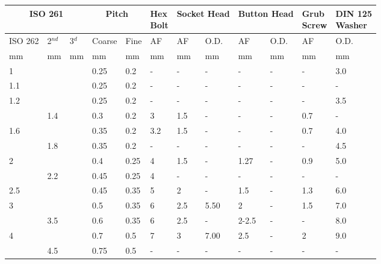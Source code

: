 \begin{table}[h!]
\begin{longtable}{lll|ll|llllll|l}
	\multicolumn{3}{c}{ISO 261}
    &\multicolumn{2}{c}{Pitch}
    &\specialcell{Hex\\Bolt}
    &\multicolumn{2}{c}{Socket Head}
    &\multicolumn{2}{c}{Button Head}
    &\specialcell{Grub\\Screw}
    &\specialcell{DIN 125\\Washer}
    \\
\hline
	ISO 262
    &2$^{nd}$
    &3$^{d}$
    &Coarse
    &Fine
    & AF %
    & AF %
    & O.D.
    & AF %
    & O.D.
    & AF %
    & O.D. %
    \\
\hline
	mm
    &mm
    &mm
    &mm
    &mm
    &mm
    &mm
    &mm
    &mm
    &mm
    &mm
    &mm
    \\
\hline
    1   &    &    &0.25 &0.2        &-   &-      &-      &-      &- &-    &3.0   \\
    1.1 &    &    &0.25 &0.2        &-   &-      &-      &-      &- &-    &-     \\
    1.2 &    &    &0.25 &0.2        &-   &-      &-      &-      &- &-    &3.5   \\
        &1.4 &    &0.3  &0.2        &3   &1.5    &-      &-      &- &0.7  &-     \\
    1.6 &    &    &0.35 &0.2        &3.2 &1.5    &-      &-      &- &0.7  &4.0   \\
        &1.8 &    &0.35 &0.2        &-   &-      &-      &-      &- &-    &4.5   \\
    2   &    &    &0.4  &0.25       &4   &1.5    &-      &1.27   &- &0.9  &5.0   \\
        &2.2 &    &0.45 &0.25       &4   &-      &-      &-      &- &-    &-     \\
    2.5 &    &    &0.45 &0.35       &5   &2      &-      &1.5    &- &1.3  &6.0   \\
    3   &    &    &0.5  &0.35       &6   &2.5    &5.50   &2      &- &1.5  &7.0   \\
        &3.5 &    &0.6  &0.35       &6   &2.5    &-      &2-2.5  &- &-    &8.0   \\
    4   &    &    &0.7  &0.5        &7   &3      &7.00   &2.5    &- &2    &9.0   \\
        &4.5 &    &0.75 &0.5        &-   &-      &-      &-      &- &-    &-     \\

\end{longtable}
\end{table}
